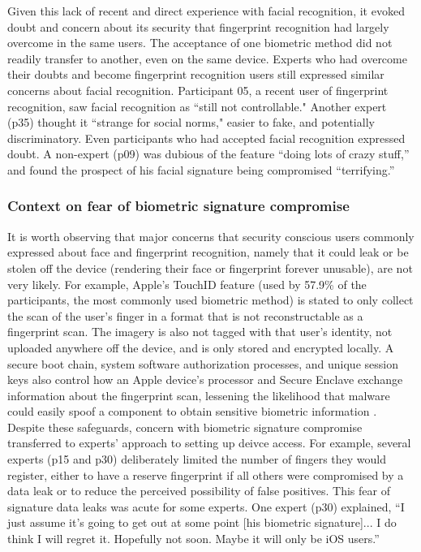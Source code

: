 Given this lack of recent and direct experience with facial recognition, it evoked doubt and concern about its security that fingerprint recognition had largely overcome in the same users. The acceptance of one biometric method did not readily transfer to another, even on the same device. Experts who had overcome their doubts and become fingerprint recognition users still expressed similar concerns about facial recognition. Participant 05, a recent user of fingerprint recognition, saw facial recognition as ``still not controllable." Another expert (p35) thought it ``strange for social norms," easier to fake, and potentially discriminatory. Even participants who had accepted facial recognition expressed doubt. A non-expert (p09) was dubious of the feature ``doing lots of crazy stuff,'' %
and found the prospect of his facial signature being compromised ``terrifying.''

\subsubsection{Context on fear of biometric signature compromise}
It is worth observing that major concerns that security conscious users commonly expressed about face and fingerprint recognition, namely that it could leak or be stolen off the device (rendering their face or fingerprint forever unusable), are not very likely. For example, Apple's TouchID feature (used by 57.9\% of the participants, the most commonly used biometric method) is stated to only collect the scan of the user's finger in a format that is not reconstructable as a fingerprint scan. The imagery is also not tagged with that user's identity, not uploaded anywhere off the device, and is only stored and encrypted locally. A secure boot chain, system software authorization processes, and unique session keys also control how an Apple device's processor and Secure Enclave exchange information about the fingerprint scan, lessening the likelihood that malware could easily spoof a component to obtain sensitive biometric information \cite{iOS_security}. 
Despite these safeguards, concern with biometric signature compromise  transferred to experts' approach to setting up deivce access. For example, several experts (p15 and p30) deliberately limited the number of fingers they would register, either to have a reserve fingerprint if all others were compromised by a data leak or to reduce the perceived possibility of false positives. This fear of signature data leaks was acute for some experts. One expert (p30) explained, ``I just assume it's going to get out at some point [his biometric signature]... I do think I will regret it. Hopefully not soon. Maybe it will only be iOS users.''

